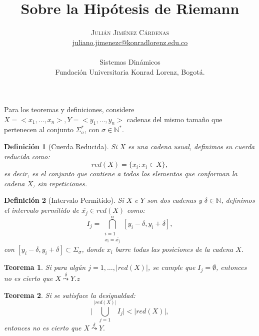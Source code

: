 \documentclass[twocolumn]{article}
\title{Sobre la Hipótesis de Riemann} %
\author{%
\textsc{Julián Jiménez Cárdenas} \\[1ex] %
\normalsize \href{mailto:juliano.jimenezc@konradlorenz.edu.co}{juliano.jimenezc@konradlorenz.edu.co} %
\\ \\ \normalsize{Sistemas Dinámicos}
\\ \normalsize{Fundación Universitaria Konrad Lorenz, Bogotá.} %
}
\date{} %
\newtheorem{theorem}{Teorema}
\newtheorem{definition}{Definición}
\begin{document}
Para los teoremas y definiciones, considere $X=<x_1,\dots,x_n>,Y=<y_1,\dots,y_n>$ cadenas del mismo tamaño que pertenecen al conjunto $\Sigma_\sigma^*$, con $\sigma\in\mathbb{N^*}$. 
\begin{definition}[Cuerda Reducida]
Si $X$ es una cadena usual, definimos su cuerda reducida como:
\begin{equation}
	red(X)=\{x_i: x_i\in X\},
\end{equation}
es decir, es el conjunto que contiene a todos los elementos que conforman la cadena $X$, sin repeticiones.
\end{definition}


\begin{definition}[Intervalo Permitido]
Si $X$ e $Y$ son dos cadenas y $\delta\in\mathbb{N}$, definimos el intervalo permitido de $\overline{x_j}\in red(X)$ como:
\begin{equation}
	I_j=\bigcap\limits_{\substack{i=1 \\ x_i=\overline{x_j}}}^n [y_i-\delta,y_i+\delta],
\end{equation}
con $[y_i-\delta,y_i+\delta]\subset\Sigma_\sigma$, donde $x_i$ barre todas las posiciones de la cadena $X$.
\end{definition}

\begin{theorem}
Si para algún $j=1,\dots,|red(X)|$, se cumple que $I_j=\emptyset$, entonces no es cierto que $X\overset{\delta}{\leadsto} Y.$z
\end{theorem}

\begin{theorem}
Si se satisface la desigualdad:
\begin{equation}
\Big|\bigcup\limits_{j=1}^{|red(X)|} I_j\Big|<|red(X)|,
\end{equation}
entonces no es cierto que $X\overset{\delta}{\leadsto} Y.$
\end{theorem}
\end{document}
